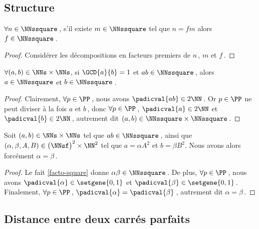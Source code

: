 \subsection{Structure}


\begin{fact} \label{facto-square}
	$\forall n \in \NNssquare$\,, s'il existe $m \in \NNssquare$ tel que $n =  f m$ alors $f  \in \NNssquare$\,.
\end{fact}


\begin{proof}
	Considérer les décompositions en facteurs premiers de $n$\,, $m$ et $f$\,.
\end{proof}




\begin{fact} \label{prime-square}
	$\forall (a, b) \in \NNs \times \NNs$, 
	si $\GCD{a}{b} = 1$ et $a b \in \NNssquare$\,,
	alors $a \in \NNssquare$ et $b \in \NNssquare$\,.
\end{fact}


\begin{proof}
	Clairement, $\forall p \in \PP$\,, nous avons $\padicval{ab} \in 2 \NN$\,.
    Or $p \in \PP$ ne peut diviser à la fois $a$ et $b$\,, donc
    $\forall p \in \PP$\,, 
    $\padicval{a} \in 2 \NN$ et $\padicval{b} \in 2 \NN$\,,
    autrement dit 
    $(a, b) \in \NNssquare \times \NNssquare$\,.
\end{proof}




\begin{fact} \label{same-square-free}
	Soit $(a, b) \in \NNs \times \NNs$ tel que $a b \in \NNssquare$\,,
	ainsi que $(\alpha, \beta, A, B) \in \big( \NNsf \big)^2 \times \NN^2$ tel que $a = \alpha A^2$ et $b = \beta B^2$.
	Nous avons alors forcément $\alpha = \beta$\,.
\end{fact}


\begin{proof}
	Le fait \ref{facto-square} donne $\alpha \beta \in \NNssquare$\,.
	De plus, $\forall p \in \PP$\,, nous avons 
	$\padicval{\alpha} \in \setgene{0, 1}$
	et
	$\padicval{\beta} \in \setgene{0, 1}$\,.
	Finalement, $\forall p \in \PP$\,, $\padicval{\alpha} = \padicval{\beta}$\,, autrement dit $\alpha = \beta$\,.
\end{proof}




\subsection{Distance entre deux carrés parfaits}


